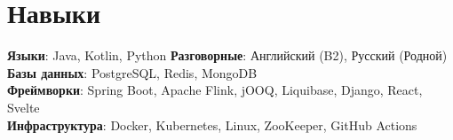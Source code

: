 \section{Навыки}
 \begin{itemize}[leftmargin=0.15in, label={}]
    \small{\item{
     \textbf{Языки}{: Java, Kotlin, Python} \hfill \textbf{Разговорные}{: Английский (B2), Русский (Родной)} \\
     \textbf{Базы данных}{: PostgreSQL, Redis, MongoDB} \\
     \textbf{Фреймворки}{: Spring Boot, Apache Flink, jOOQ, Liquibase, Django, React, Svelte} \\
     \textbf{Инфраструктура}{: Docker, Kubernetes, Linux, ZooKeeper, GitHub Actions} \\
    }}
 \end{itemize}